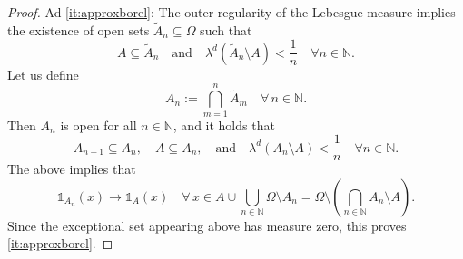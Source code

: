 \documentclass[reqno]{shinyart}
\begin{document}
\begin{proof}
    Ad \ref{it:approxborel}: The outer regularity of the Lebesgue measure implies the existence
    of open sets $\tilde{A}_n \subseteq \Omega$ such that
    \begin{equation*}
        A \subseteq \tilde{A}_n 
        \quad \text{and} \quad 
        \lambda^d(\tilde{A}_n \setminus A) < \frac{1}{n}\quad \forall n \in \mathbb{N}.
    \end{equation*}
    Let us define
    \begin{equation*}
        A_n := \bigcap_{m=1}^n \tilde{A}_m \quad \forall\, n \in \mathbb{N}.
    \end{equation*}
    Then $A_n$ is open for all $n \in \mathbb{N}$, and it holds that
    \begin{equation*}
        A_{n+1}\subseteq A_n,\quad A \subseteq A_n, 
        \quad \text{and} \quad \lambda^d(A_n \setminus A) < \frac{1}{n}\quad \forall n \in \mathbb{N}. 
    \end{equation*}
    The above implies that 
    \begin{equation*}
        \mathbb{1}_{A_n}(x) \to  \mathbb{1}_{A}(x)
        \quad \forall \, x \in A \cup \bigcup_{n \in \mathbb{N}}  \Omega \setminus A_n 
        = \Omega \setminus \left ( \bigcap_{n\in \mathbb{N}} A_n \setminus A \right ). 
    \end{equation*}
    Since the exceptional set appearing above has measure zero, this proves \ref{it:approxborel}.


\end{proof}
\end{document}
